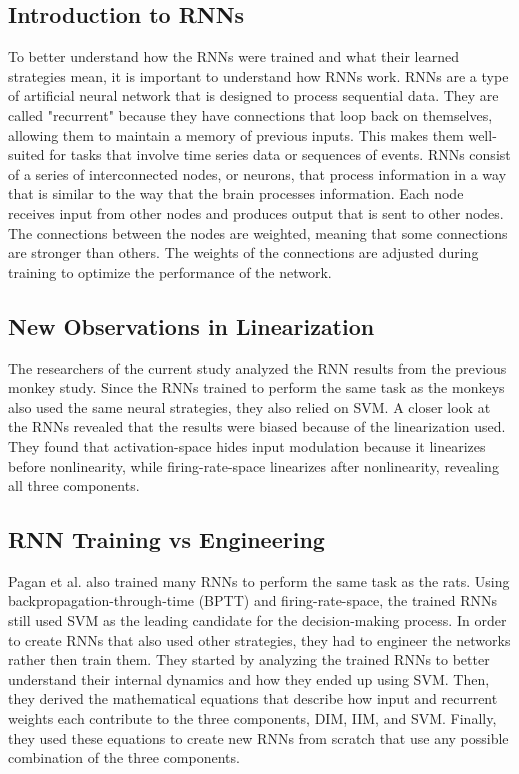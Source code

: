 \documentclass{article}
\begin{document}
\subsection{Introduction to RNNs}
To better understand how the RNNs were trained and what their learned strategies mean, it is important to understand how RNNs work. RNNs are a type of artificial neural network that is designed to process sequential data. They are called "recurrent" because they have connections that loop back on themselves, allowing them to maintain a memory of previous inputs. This makes them well-suited for tasks that involve time series data or sequences of events. RNNs consist of a series of interconnected nodes, or neurons, that process information in a way that is similar to the way that the brain processes information. Each node receives input from other nodes and produces output that is sent to other nodes. The connections between the nodes are weighted, meaning that some connections are stronger than others. The weights of the connections are adjusted during training to optimize the performance of the network.

\subsection{New Observations in Linearization}
The researchers of the current study analyzed the RNN results from the previous monkey study. Since the RNNs trained to perform the same task as the monkeys also used the same neural strategies, they also relied on SVM. A closer look at the RNNs revealed that the results were biased because of the linearization used. They found that activation-space hides input modulation because it linearizes before nonlinearity, while firing-rate-space linearizes after nonlinearity, revealing all three components.

\subsection{RNN Training vs Engineering}
Pagan et al. also trained many RNNs to perform the same task as the rats. Using backpropagation-through-time (BPTT) and firing-rate-space, the trained RNNs still used SVM as the leading candidate for the decision-making process. In order to create RNNs that also used other strategies, they had to engineer the networks rather then train them. They started by analyzing the trained RNNs to better understand their internal dynamics and how they ended up using SVM. Then, they derived the mathematical equations that describe how input and recurrent weights each contribute to the three components, DIM, IIM, and SVM. Finally, they used these equations to create new RNNs from scratch that use any possible combination of the three components.
\end{document}
